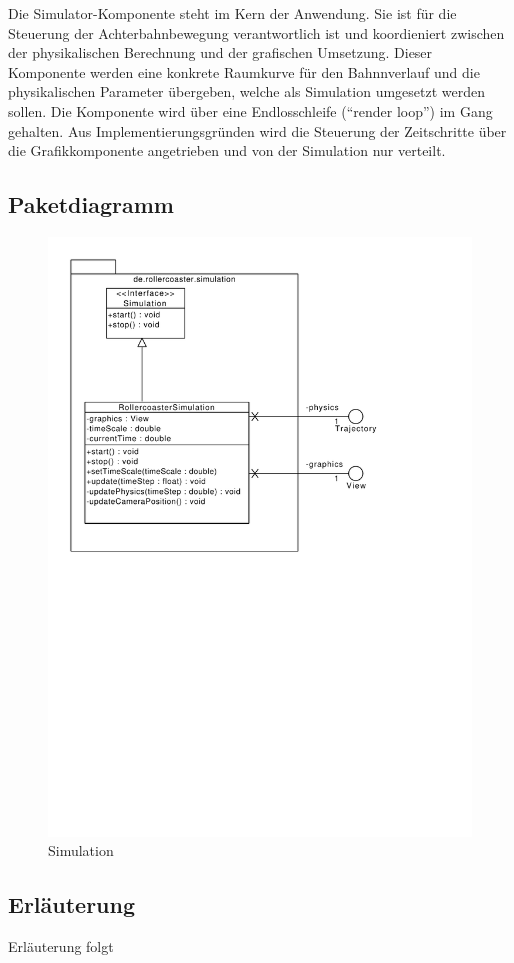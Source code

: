 Die Simulator-Komponente steht im Kern der Anwendung. Sie ist für die Steuerung der
Achterbahnbewegung verantwortlich ist und koordieniert zwischen der physikalischen 
Berechnung und der grafischen Umsetzung. Dieser Komponente werden eine konkrete 
Raumkurve für den Bahnnverlauf und die physikalischen Parameter übergeben, welche
als Simulation umgesetzt werden sollen. Die Komponente wird über eine 
Endlosschleife (``render loop'') im Gang gehalten. Aus Implementierungsgründen wird
die Steuerung der Zeitschritte über die Grafikkomponente angetrieben und von der
Simulation nur verteilt.

\subsection{Paketdiagramm}
\begin{figure}
\includegraphics[width=\linewidth]{bilder/Simulation}
\caption{Simulation}
\end{figure}

\subsection{Erläuterung}

Erläuterung folgt
